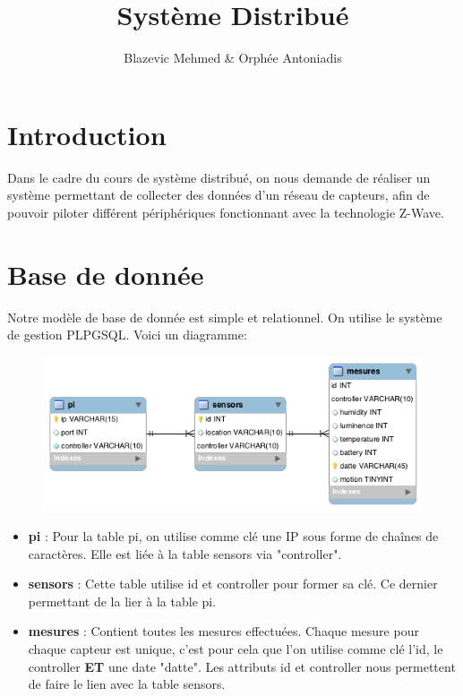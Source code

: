 \documentclass[11pt, oneside]{article}   	%
\title{\huge{\textbf{Système Distribué}}}
\author{Blazevic Mehmed \& Orphée Antoniadis}
\begin{document}
\maketitle
\section{Introduction}
Dans le cadre du cours de système distribué, on nous demande de réaliser un système permettant
de collecter des données d'un réseau de capteurs, afin de pouvoir piloter différent périphériques
fonctionnant avec la technologie Z-Wave.

\newpage
\section{Base de donnée}
Notre modèle de base de donnée est simple et relationnel. On utilise le système de gestion
PLPGSQL. Voici un diagramme:

\begin{figure}[!h]
\begin{center}
\includegraphics[scale=0.8]{images/distributed_bdd.png}
\end{center}
\end{figure}

\begin{itemize}
    \item \textbf{pi}   :  Pour la table pi, on utilise comme clé une IP sous forme de chaînes
    de caractères. Elle est liée à la table sensors via "controller".
    \item \textbf{sensors} : Cette table utilise id et controller pour former sa clé. Ce dernier
    permettant de la lier à la table pi.
    \item \textbf{mesures} : Contient toutes les mesures effectuées. Chaque mesure pour chaque
    capteur est unique, c'est pour cela que l'on utilise comme clé l'id, le controller \textbf{ET}
    une date "datte". Les attributs id et controller nous permettent de faire le lien avec la table sensors.

\end{itemize}
\end{document}
